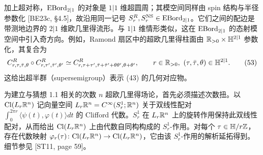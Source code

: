 加上超对称，$\operatorname{EBord}_{2|1}$ 的对象是 $1|1$ 维超圆周；其模空间同样由 spin 结构与半径参数化 [BE23c, §4.5]，故沿用同一记号 $S^R_r,S^{\mathrm{NS}}_r\in\operatorname{EBord}_{2|1}$。它们之间的配边是带测地边界的 $2|1$ 维欧几里得流形。与 $1|1$ 维情形类似，这在 $\operatorname{EBord}_{2|1}$ 的态射模空间中引入奇方向。例如，Ramond 扇区中的超欧几里得柱面由 $\mathbb{R}_{>0}\times\mathbb{H}^{2|1}$ 参数化，其复合为
\begin{equation}
C^R_{r,\tau,\bar\tau,\theta}\circ C^R_{r,\tau',\bar\tau',\theta'}\simeq C^R_{r,\tau+\tau',\bar\tau+\bar\tau'+\theta\theta',\theta+\theta'},
\qquad r\in\mathbb{R}_{>0},\ (\tau,\bar\tau,\theta)\in\mathbb{H}^{2|1}.
\tag{53}
\end{equation}
这给出超半群（supersemigroup）表示 (43) 的几何对应物。

为建立与猜想 1.1 相关的次数 $n$ 超欧几里得场论，首先必须描述次数扭。以 $\mathrm{Cl}(L_r\mathbb{R}^n)$ 记向量空间 $L_r\mathbb{R}^n=C^\infty(S^1_r;\mathbb{R}^n)$ 关于双线性配对 $\int_0^{2\pi r}\langle\psi(t),\varphi(t)\rangle dt$ 的 Clifford 代数。$S^1_r$ 在 $L_r\mathbb{R}^n$ 上的旋转作用保持此双线性配对，从而给出 $\mathrm{Cl}(L_r\mathbb{R}^n)$ 上由代数自同构构成的 $S^1_r$-作用。对每个 $\tau\in\mathbb{H}/r\mathbb{Z}$，存在代数映射 $\varphi_r(\tau)\colon\mathrm{Cl}(L_r\mathbb{R}^n)\to\mathrm{Cl}(L_r\mathbb{R}^n)$，它由该 $S^1_r$-作用的解析延拓得到。细节参见 [ST11, page 59]。

